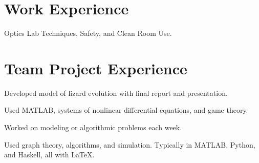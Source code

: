 \documentclass[]{deedy-resume-openfont}
\begin{document}
\hfill
\begin{minipage}[t]{0.55\textwidth} 



\section{Work Experience}

\sectionsep

\vspace{\topsep} %
\begin{tightemize}
\item Optics Lab Techniques, Safety, and Clean Room Use.
\end{tightemize}
\sectionsep


\section{Team Project Experience}
\vspace{\topsep}
\begin{tightemize}
\item Developed model of lizard evolution with final report
and presentation.
\item Used MATLAB, systems of nonlinear differential equations, and game theory.
\end{tightemize}
\sectionsep

\vspace{\topsep}
\begin{tightemize}
\item Worked on modeling or algorithmic problems each week.
\item Used graph theory, algorithms, and simulation. Typically in MATLAB,
Python, and Haskell, all with \LaTeX.
\end{tightemize}
\sectionsep


\end{minipage}
\end{document}
